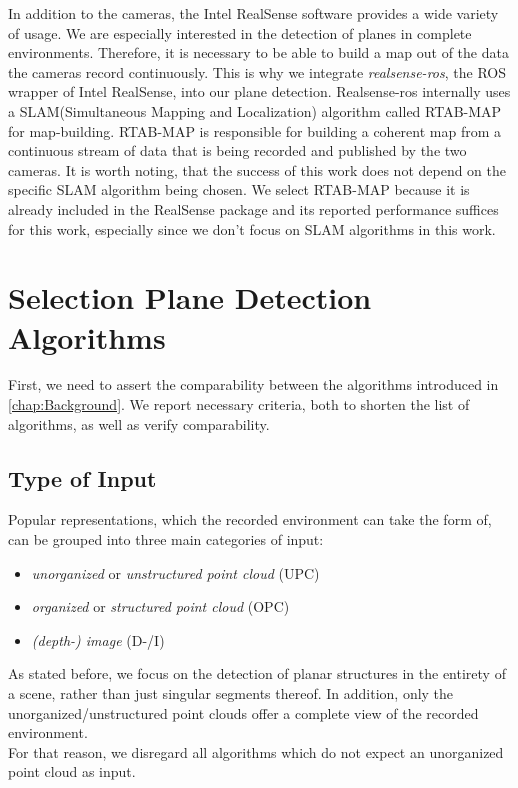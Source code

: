 \documentclass[main.tex]{subfiles}
\begin{document}
In addition to the cameras, the Intel RealSense software provides a wide variety of usage. We are especially interested in the detection of planes in complete environments.
Therefore, it is necessary to be able to build a map out of the data the cameras record continuously.
This is why we integrate \textit{realsense-ros}, the ROS wrapper of Intel RealSense, into our plane detection.
Realsense-ros internally uses a SLAM(Simultaneous Mapping and Localization) algorithm called RTAB-MAP \cite{Labbé_Michaud_2019} for map-building.
RTAB-MAP is responsible for building a coherent map from a continuous stream of data that is being recorded and published by the two cameras.
It is worth noting, that the success of this work does not depend on the specific SLAM algorithm being chosen. We select RTAB-MAP because
it is already included in the RealSense package and its reported performance suffices for this work, especially since we don't focus on SLAM
algorithms in this work.



\section{Selection Plane Detection Algorithms}
First, we need to assert the comparability between the algorithms introduced in \ref{chap:Background}.
We report necessary criteria, both to shorten the list of algorithms, as well as verify comparability.

\subsection*{Type of Input}
Popular representations, which the recorded environment can take the form of, can be grouped into three main categories of input:
\begin{itemize}
    \item \textit{unorganized} or \textit{unstructured point cloud} (UPC)
    \item \textit{organized} or \textit{structured point cloud} (OPC)
    \item \textit{(depth-) image} (D-/I)
\end{itemize}

As stated before, we focus on the detection of planar structures in the entirety of a scene, rather than just singular segments thereof.
In addition, only the unorganized/unstructured point clouds offer a complete view of the recorded environment.\\
For that reason, we disregard all algorithms which do not expect an unorganized point cloud as input.
\end{document}

